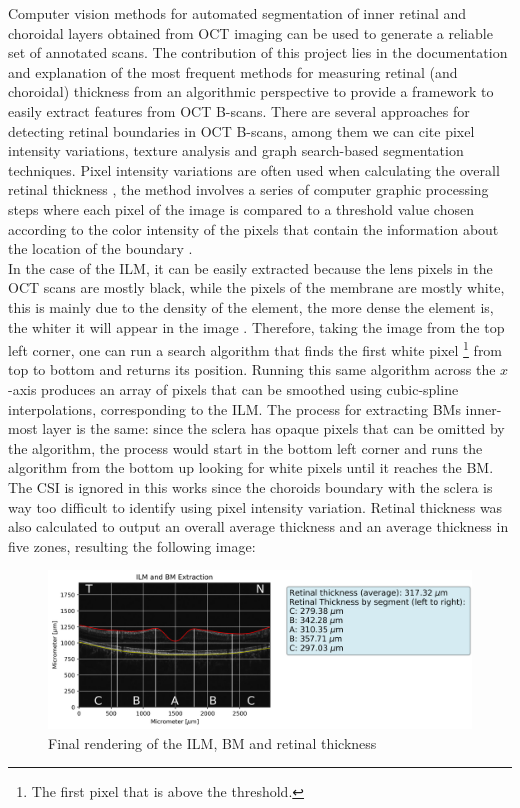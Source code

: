 \documentclass[12pt,a4paper]{scrartcl}
\begin{document}
Computer vision methods for automated segmentation of inner retinal and choroidal layers obtained from OCT imaging \cite{Ronchetti2019statistic} can be used to generate a reliable set of annotated scans. 
The contribution of this project lies in the documentation and explanation of the most frequent methods for measuring retinal (and choroidal) thickness from an algorithmic perspective to provide a framework to easily extract features from OCT B-scans. 
There are several approaches for detecting retinal boundaries in OCT B-scans, among them we can cite pixel intensity variations, texture analysis and graph search-based segmentation techniques. Pixel intensity variations are often used when calculating the overall retinal thickness \cite{Alonso-Caneiro2013}, the method involves a series of computer graphic processing steps where each pixel of the image is compared to a threshold value chosen according to the color intensity of the pixels that contain the information about the location of the boundary \cite{Fabritius:09}. 
\\
In the case of the ILM, it can be easily extracted because the lens pixels in the OCT scans are mostly black, while the pixels of the membrane are mostly white, this is mainly due to the density of the element, the more dense the element is, the whiter it will appear in the image \cite{Brar597}. Therefore, taking the image from the top left corner, one can run a search algorithm that finds the first white pixel \footnote{The first pixel that is above the threshold.} from top to bottom and returns its position. Running this same algorithm across the $x$-axis produces an array of pixels that can be smoothed using cubic-spline interpolations, corresponding to the ILM. The process for extracting BM\textquotesingle s inner-most layer is the same: since the sclera has opaque pixels that can be omitted by the algorithm, the process would start in the bottom left corner and runs the algorithm from the bottom up looking for white pixels until it reaches the BM. The CSI is ignored in this works since the choroid\textquotesingle s boundary with the sclera is way too difficult to identify using pixel intensity variation. 
Retinal thickness was also calculated to output an overall average thickness and an average thickness in five zones, resulting the following image:

\begin{figure}[H]
    \centering
    \includegraphics[width=1\textwidth]{./images/ILM_BM_Extracted.png}
    \caption{Final rendering of the ILM, BM and retinal thickness}
    \label{fig:final_rendering}
\end{figure}
\end{document}
